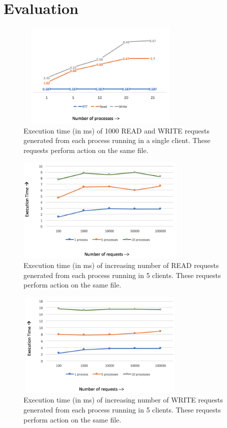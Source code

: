 \section{Evaluation}

\begin{figure}
\centering
\includegraphics[height=2in, width=3.2in]{images/F_OneClient.png}
\caption{Execution time (in ms) of 1000 READ and WRITE requests generated from each process running in a single client. These requests perform action on the same file.}
\end{figure}

\begin{figure}
\centering
\includegraphics[height=2in, width=3.2in]{images/F-HC-SF-R.png}
\caption{Execution time (in ms) of increasing number of READ requests generated from each process running in 5 clients. These requests perform action on the same file.}
\end{figure}

\begin{figure}
\centering
\includegraphics[height=2in, width=3.2in]{images/F-HC-SF-W.png}
\caption{Execution time (in ms) of increasing number of WRITE requests generated from each process running in 5 clients. These requests perform action on the same file.}
\end{figure}


